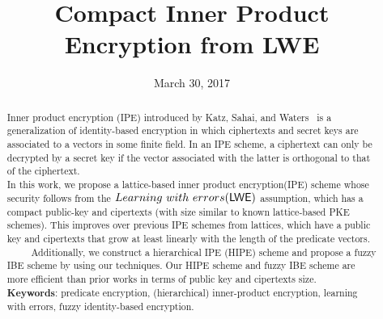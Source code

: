 \documentclass{llncs}
\begin{document}
\title{Compact Inner Product Encryption from LWE}%

\author{}


\date{March 30, 2017}
\maketitle

\begin{abstract}
Inner product encryption (IPE) introduced by Katz, Sahai, and Waters~\cite{EC:KatSahWat08} is a generalization of identity-based encryption in which ciphertexts and secret keys are associated to a vectors in some finite field. In an IPE scheme, a ciphertext can only be decrypted by a secret key if the vector associated with the latter is orthogonal to that of the ciphertext.\\
In this work, we propose a lattice-based inner product encryption(IPE) scheme whose security follows from the $Learning~with~errors (\mathsf{LWE})$ assumption, which has a compact public-key and cipertexts (with size similar to known lattice-based PKE schemes). This improves over previous IPE schemes from lattices, which have a public key and cipertexts that grow at least linearly with the length of the predicate vectors.\\
~~~~~Additionally, we construct a hierarchical IPE (HIPE) scheme and propose a fuzzy IBE scheme by using our techniques. Our HIPE scheme and fuzzy IBE scheme are more efficient than prior works in terms of public key and cipertexts size.\\
\textbf{Keywords}: predicate encryption, (hierarchical) inner-product encryption, learning with errors, fuzzy identity-based encryption.
\end{abstract}
















\end{document}
